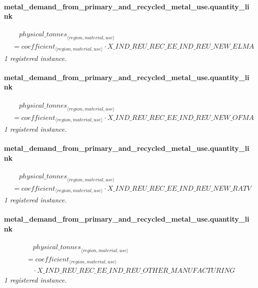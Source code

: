 \documentclass[11pt]{article}
\begin{document}
\paragraph{metal\_demand\_from\_primary\_and\_recycled\_metal\_use.quantity\_link}
\begin{align*}
&\quad {physical\_tonnes}_{\langle region, material, use\rangle}\\
&= coefficient_{\langle region, material, use\rangle} \cdot X\_IND\_REU\_REC\_EE\_IND\_REU\_NEW\_ELMA
\end{align*}
\noindent\emph{1 registered instance.}\par
\paragraph{metal\_demand\_from\_primary\_and\_recycled\_metal\_use.quantity\_link}
\begin{align*}
&\quad {physical\_tonnes}_{\langle region, material, use\rangle}\\
&= coefficient_{\langle region, material, use\rangle} \cdot X\_IND\_REU\_REC\_EE\_IND\_REU\_NEW\_OFMA
\end{align*}
\noindent\emph{1 registered instance.}\par
\paragraph{metal\_demand\_from\_primary\_and\_recycled\_metal\_use.quantity\_link}
\begin{align*}
&\quad {physical\_tonnes}_{\langle region, material, use\rangle}\\
&= coefficient_{\langle region, material, use\rangle} \cdot X\_IND\_REU\_REC\_EE\_IND\_REU\_NEW\_RATV
\end{align*}
\noindent\emph{1 registered instance.}\par
\paragraph{metal\_demand\_from\_primary\_and\_recycled\_metal\_use.quantity\_link}
\begin{align*}
&\quad {physical\_tonnes}_{\langle region, material, use\rangle}\\
&= coefficient_{\langle region, material, use\rangle}\\
&\quad {}\cdot X\_IND\_REU\_REC\_EE\_IND\_REU\_OTHER\_MANUFACTURING
\end{align*}
\noindent\emph{1 registered instance.}\par
\end{document}
